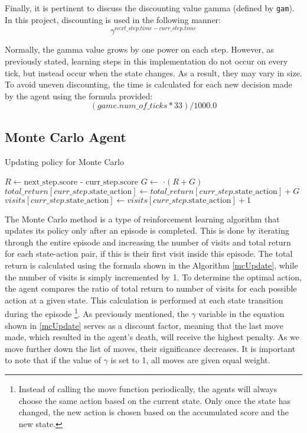 Finally, it is pertinent to discuss the discounting value gamma (defined by \texttt{gam}). In this project, discounting is used in the following manner: $$\gamma^{next\_step.time - curr\_step.time}$$

Normally, the gamma value grows by one power on each step. However, as previously stated, learning steps in this implementation do not occur on every tick, but instead occur when the state changes. As a result, they may vary in size. To avoid uneven discounting, the time is calculated for each new decision made by the agent using the formula provided:  $$(game.num\_of\_ticks * 33) / 1000.0$$

\subsection{Monte Carlo Agent}

\begin{algorithm}
\caption{Updating policy for Monte Carlo}\label{mcUpdate}
\begin{algorithmic}[1]
\State $R \gets \text{next\_step.score - curr\_step.score}$
\State $G \gets $ $\cdot (R + G)$
\State $total\_return[curr\_step.\text{state\_action}] \gets total\_return[curr\_step.\text{state\_action}] + G$
\State $visits[curr\_step.\text{state\_action}] \gets visits[curr\_step.\text{state\_action}] + 1$
\EndIf
\end{algorithmic}
\end{algorithm}

The Monte Carlo method is a type of reinforcement learning algorithm that updates its policy only after an episode is completed. This is done by iterating through the entire episode and increasing the number of visits and total return for each state-action pair, if this is their first visit inside this episode. The total return is calculated using the formula shown in the Algorithm \ref{mcUpdate}, while the number of visits is simply incremented by 1. To determine the optimal action, the agent compares the ratio of total return to number of visits for each possible action at a given state. This calculation is performed at each state transition during the episode \footnote{Instead of calling the move function periodically, the agents will always choose the same action based on the current state. Only once the state has changed, the new action is chosen based on the accumulated score and the new state.}.
As previously mentioned, the $\gamma$ variable in the equation shown in \ref{mcUpdate} serves as a discount factor, meaning that the last move made, which resulted in the agent's death, will receive the highest penalty. As we move further down the list of moves, their significance decreases. It is important to note that if the value of $\gamma$ is set to 1, all moves are given equal weight. 

